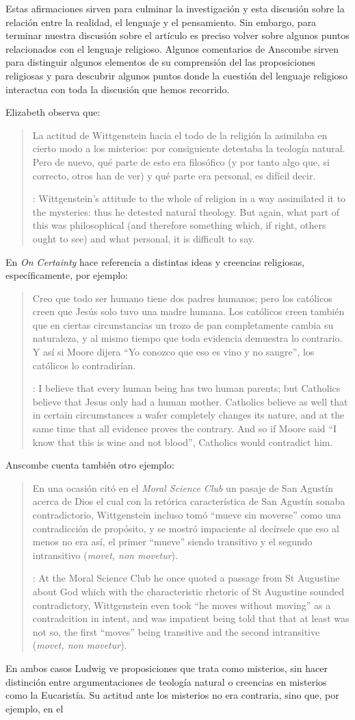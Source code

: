 Estas afirmaciones sirven para culminar la investigación y esta discusión sobre la relación entre la realidad, el lenguaje y el pensamiento. Sin embargo, para terminar nuestra discusión sobre el artículo es preciso volver sobre algunos puntos relacionados con el lenguaje religioso. Algunos comentarios de Anscombe sirven para distinguir algunos elementos de su comprensión del las proposiciones religiosas y para descubrir algunos puntos donde la cuestión del lenguaje religioso interactua con toda la discusión que hemos recorrido.

Elizabeth observa que: \blockquote[{\cite[123]{anscombe1981parmenides:qli}}: Wittgenstein's attitude to the whole of religion in a way assimilated it to the mysteries: thus he detested natural theology. But again, what part of this was philosophical (and therefore something which, if right, others ought to see) and what personal, it is difficult to say.]{La actitud de Wittgenstein hacia el todo de la religión la asimilaba en cierto modo a los misterios: por consiguiente detestaba la teología natural. Pero de nuevo, qué parte de esto era filosófico (y por tanto algo que, si correcto, otros han de ver) y qué parte era personal, es difícil decir.} En \emph{On Certainty} hace referencia a distintas ideas y creencias religiosas, específicamente, por ejemplo: \blockquote[{\cite[\S239]{wittgenstein1969oncert}}: I believe that every human being has two human parents; but Catholics believe that Jesus only had a human mother. \textelp{} Catholics believe as well that in certain circumstances a wafer completely changes its nature, and at the same time that all evidence proves the contrary. And so if Moore said ``I know that this is wine and not blood'', Catholics would contradict him.]{Creo que todo ser humano tiene dos padres humanos; pero los católicos creen que Jesús solo tuvo una madre humana. \textelp{} Los católicos creen también que en ciertas circunstancias un trozo de pan completamente cambia su naturaleza, y al mismo tiempo que toda evidencia demuestra lo contrario. Y así si Moore dijera ``Yo conozco que eso es vino y no sangre'', los católicos lo contradirían.} Anscombe cuenta también otro ejemplo:\blockquote[{\cite[122]{anscombe1981parmenides:qli}}: At the Moral Science Club he once quoted a passage from St Augustine about God which with the characteristic rhetoric of St Augustine sounded contradictory, Wittgenstein even took ``he moves without moving'' as a contradcition in intent, and was impatient being told that that at least was not so, the first ``moves'' being transitive and the second intransitive (\emph{movet, non movetur}).]{En una ocasión citó en el \emph{Moral Science Club} un pasaje de San Agustín acerca de Dios el cual con la retórica característica de San Agustín sonaba contradictorio, Wittgenstein incluso tomó ``mueve sin moverse'' como una contradicción de propósito, y se mostró impaciente al decírsele que eso al menos no era así, el primer ``mueve'' siendo transitivo y el segundo intransitivo (\emph{movet, non movetur}).} En ambos casos Ludwig ve proposiciones que trata como misterios, sin hacer distinción entre argumentaciones de teología natural o creencias en misterios como la Eucaristía. Su actitud ante los misterios no era contraria, sino que, por ejemplo, en el 